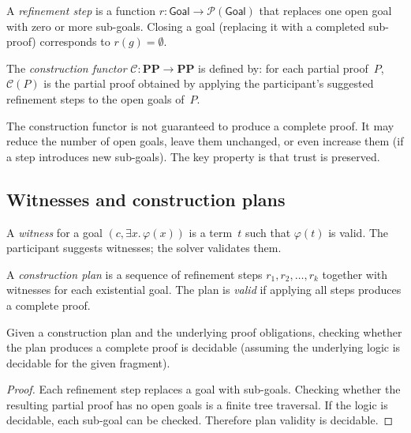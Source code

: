 \documentclass[11pt]{article}
\begin{document}
\begin{definition}\label{def:refstep}
A \emph{refinement step} is a function
$r \colon \mathsf{Goal} \to \mathcal{P}(\mathsf{Goal})$
that replaces one open goal with zero or more sub-goals.
Closing a goal (replacing it with a completed sub-proof)
corresponds to $r(g) = \emptyset$.
\end{definition}

\begin{definition}\label{def:confunctor}
The \emph{construction functor}
$\mathcal{C} \colon \mathbf{PP} \to \mathbf{PP}$
is defined by: for each partial proof~$P$, $\mathcal{C}(P)$
is the partial proof obtained by applying the participant's
suggested refinement steps to the open goals of~$P$.
\end{definition}

\begin{remark}
The construction functor is not guaranteed to produce a
complete proof.  It may reduce the number of open goals,
leave them unchanged, or even increase them (if a step
introduces new sub-goals).  The key property is that
trust is preserved.
\end{remark}

\subsection{Witnesses and construction plans}

\begin{definition}[Witness]\label{def:witness}
A \emph{witness} for a goal $(c, \exists x.\, \varphi(x))$
is a term~$t$ such that $\varphi(t)$ is valid.  The
participant suggests witnesses; the solver validates them.
\end{definition}

\begin{definition}\label{def:conplan}
A \emph{construction plan} is a sequence of refinement steps
$r_1, r_2, \ldots, r_k$ together with witnesses for each
existential goal.  The plan is \emph{valid} if applying all
steps produces a complete proof.
\end{definition}

\begin{lemma}\label{lem:planvalid}
Given a construction plan and the underlying proof obligations,
checking whether the plan produces a complete proof is decidable
(assuming the underlying logic is decidable for the given
fragment).
\end{lemma}
\begin{proof}
Each refinement step replaces a goal with sub-goals.  Checking
whether the resulting partial proof has no open goals is a
finite tree traversal.  If the logic is decidable, each
sub-goal can be checked.  Therefore plan validity is decidable.
\end{proof}
\end{document}
